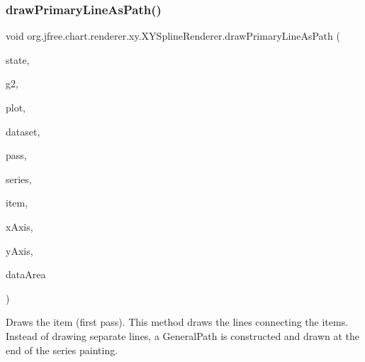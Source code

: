 \subsubsection{\texorpdfstring{draw\+Primary\+Line\+As\+Path()}{drawPrimaryLineAsPath()}}
{\footnotesize\ttfamily void org.\+jfree.\+chart.\+renderer.\+xy.\+X\+Y\+Spline\+Renderer.\+draw\+Primary\+Line\+As\+Path (\begin{DoxyParamCaption}\item[{\mbox{\hyperlink{classorg_1_1jfree_1_1chart_1_1renderer_1_1xy_1_1_x_y_item_renderer_state}{X\+Y\+Item\+Renderer\+State}}}]{state,  }\item[{Graphics2D}]{g2,  }\item[{\mbox{\hyperlink{classorg_1_1jfree_1_1chart_1_1plot_1_1_x_y_plot}{X\+Y\+Plot}}}]{plot,  }\item[{\mbox{\hyperlink{interfaceorg_1_1jfree_1_1data_1_1xy_1_1_x_y_dataset}{X\+Y\+Dataset}}}]{dataset,  }\item[{int}]{pass,  }\item[{int}]{series,  }\item[{int}]{item,  }\item[{\mbox{\hyperlink{classorg_1_1jfree_1_1chart_1_1axis_1_1_value_axis}{Value\+Axis}}}]{x\+Axis,  }\item[{\mbox{\hyperlink{classorg_1_1jfree_1_1chart_1_1axis_1_1_value_axis}{Value\+Axis}}}]{y\+Axis,  }\item[{Rectangle2D}]{data\+Area }\end{DoxyParamCaption})\hspace{0.3cm}{\ttfamily [protected]}}

Draws the item (first pass). This method draws the lines connecting the items. Instead of drawing separate lines, a General\+Path is constructed and drawn at the end of the series painting.



